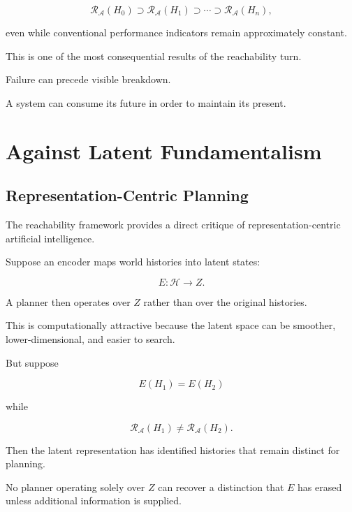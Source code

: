 \documentclass[11pt]{article}
\theoremstyle{remark}
\newcommand{\Adm}{\mathcal{A}}
\newcommand{\Reach}{\mathcal{R}}
\newcommand{\Hist}{\mathcal{H}}
\begin{document}
\begin{equation}
\Reach_{\Adm}(H_0)
\supset
\Reach_{\Adm}(H_1)
\supset
\cdots
\supset
\Reach_{\Adm}(H_n),
\end{equation}

even while conventional performance indicators remain approximately constant.

This is one of the most consequential results of the reachability turn.

Failure can precede visible breakdown.

A system can consume its future in order to maintain its present.

\section{Against Latent Fundamentalism}

\subsection{Representation-Centric Planning}

The reachability framework provides a direct critique of representation-centric artificial intelligence.

Suppose an encoder maps world histories into latent states:

\begin{equation}
E:\Hist\rightarrow Z.
\end{equation}

A planner then operates over $Z$ rather than over the original histories.

This is computationally attractive because the latent space can be smoother, lower-dimensional, and easier to search.

But suppose

\begin{equation}
E(H_1)=E(H_2)
\end{equation}

while

\begin{equation}
\Reach_{\Adm}(H_1)
\neq
\Reach_{\Adm}(H_2).
\end{equation}

Then the latent representation has identified histories that remain distinct for planning.

No planner operating solely over $Z$ can recover a distinction that $E$ has erased unless additional information is supplied.
\end{document}
